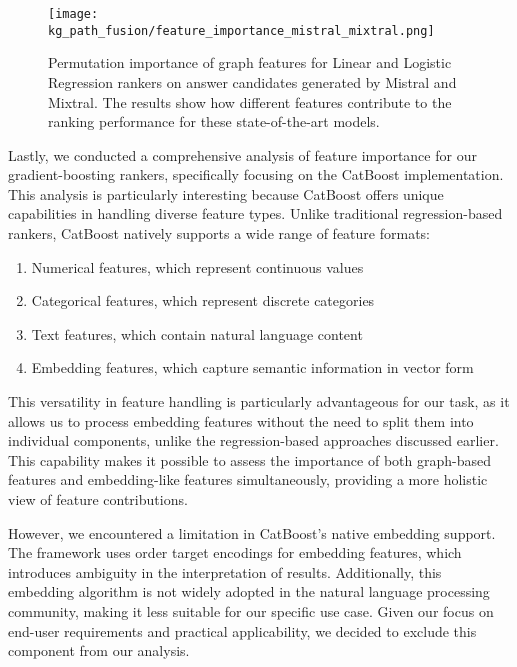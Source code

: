 \begin{figure}[htb]
   \centering
   \texttt{[image: kg\_path\_fusion/feature\_importance\_mistral\_mixtral.png]}
   \caption{Permutation importance of graph features for Linear and Logistic Regression rankers on answer candidates generated by Mistral and Mixtral. The results show how different features contribute to the ranking performance for these state-of-the-art models.}
   \label{fig:controllable_fusion:feature_importance_mistral_mixtral}
\end{figure}

Lastly, we conducted a comprehensive analysis of feature importance for our gradient-boosting rankers, specifically focusing on the CatBoost implementation. This analysis is particularly interesting because CatBoost offers unique capabilities in handling diverse feature types. Unlike traditional regression-based rankers, CatBoost natively supports a wide range of feature formats:

\begin{enumerate}
    \item Numerical features, which represent continuous values
    \item Categorical features, which represent discrete categories
    \item Text features, which contain natural language content
    \item Embedding features, which capture semantic information in vector form
\end{enumerate}

This versatility in feature handling is particularly advantageous for our task, as it allows us to process embedding features without the need to split them into individual components, unlike the regression-based approaches discussed earlier. This capability makes it possible to assess the importance of both graph-based features and embedding-like features simultaneously, providing a more holistic view of feature contributions.

However, we encountered a limitation in CatBoost's native embedding support. The framework uses order target encodings for embedding features, which introduces ambiguity in the interpretation of results. Additionally, this embedding algorithm is not widely adopted in the natural language processing community, making it less suitable for our specific use case. Given our focus on end-user requirements and practical applicability, we decided to exclude this component from our analysis.


